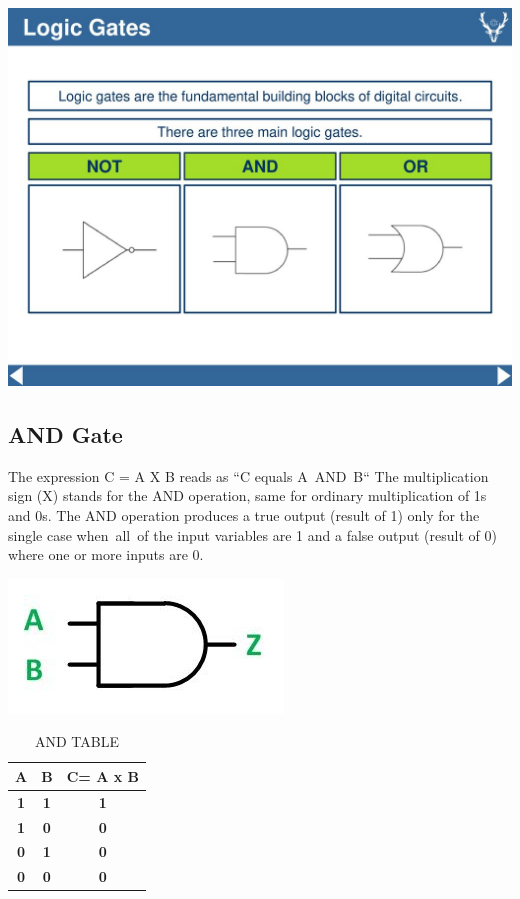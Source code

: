 \documentclass{article}
\begin{document}
\includegraphics[width=1\linewidth]{gates.jpg}
\newpage
\subsection{AND Gate}

The expression C = A X B reads as “C equals A AND B“ 
The multiplication sign (X) stands for the AND operation, same for ordinary multiplication of 1s and 0s.
The AND operation produces a true output (result of 1) only for the single case when all of the input variables are 1 and a false output (result of 0) where one or more inputs are 0.

\includegraphics[width=0.3\linewidth]{and.jpg}
\begin{table}[h!]
	\begin{center}
		\caption{AND TABLE}
		\begin{tabular}{c|c|c|}
			\textbf{A} & \textbf{B} &  \textbf{C= A x B} \\
			\hline
			\textbf{1} & \textbf{1} & \textbf{1} \\
			\textbf{1} & \textbf{0} & \textbf{0} \\
			\textbf{0} & \textbf{1} & \textbf{0} \\
			\textbf{0} & \textbf{0} & \textbf{0} \\
		\end{tabular}
	\end{center}
\end{table}
\end{document}
